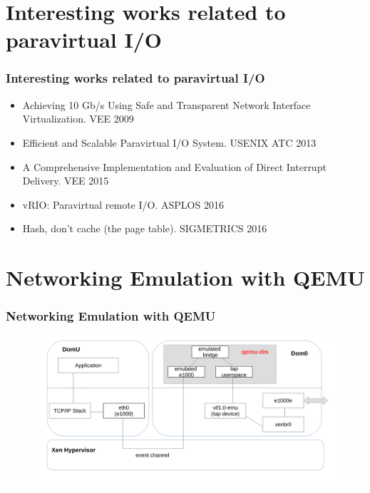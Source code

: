 \documentclass[aspectratio=169]{beamer}
\begin{document}
\section{Interesting works related to paravirtual I/O}
\begin{frame}
\frametitle{Interesting works related to paravirtual I/O}
\begin{itemize}
\item Achieving 10 Gb/s Using Safe and Transparent Network Interface Virtualization. VEE 2009
\item Efficient and Scalable Paravirtual I/O System. USENIX ATC 2013
\item A Comprehensive Implementation and Evaluation of Direct Interrupt Delivery. VEE 2015
\item vRIO: Paravirtual remote I/O.  ASPLOS 2016
\item Hash, don't cache (the page table). SIGMETRICS 2016
\end{itemize}
\end{frame}


\section{Networking Emulation with QEMU}
\begin{frame}
\frametitle{Networking Emulation with QEMU}
\begin{figure}
\includegraphics[width=1.0\linewidth]{figures/qemu.pdf}
\end{figure}
\end{frame}

\end{document}
